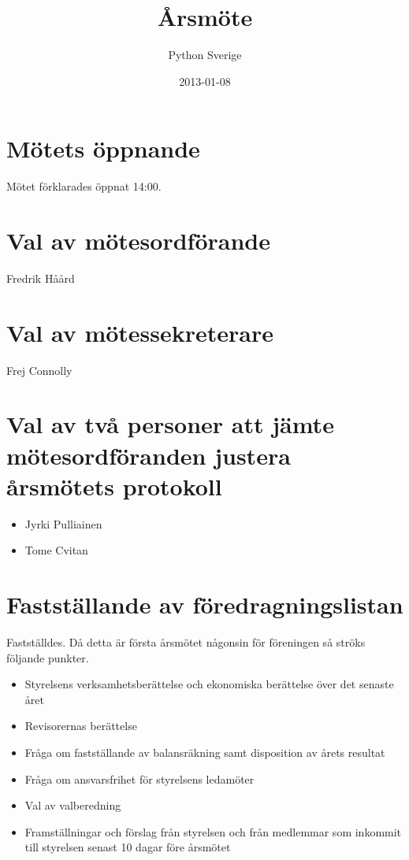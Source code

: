 \documentclass[11pt, a4paper]{article}
\title{Årsmöte}
\author{Python Sverige}
\date{2013-01-08}
\begin{document}
\maketitle

\section{Mötets öppnande}
Mötet förklarades öppnat 14:00.

\section{Val av mötesordförande}
Fredrik Håård

\section{Val av mötessekreterare}
Frej Connolly

\section{Val av två personer att jämte mötesordföranden justera årsmötets protokoll}
\begin{itemize}
    \item Jyrki Pulliainen
    \item Tome Cvitan
\end{itemize}

\section{Fastställande av föredragningslistan}
Fastställdes. Då detta är första årsmötet någonsin för föreningen så ströks
följande punkter.

\begin{itemize}
    \item Styrelsens verksamhetsberättelse och ekonomiska berättelse över det senaste året
    \item Revisorernas berättelse
    \item Fråga om fastställande av balansräkning samt disposition av årets resultat
    \item Fråga om ansvarsfrihet för styrelsens ledamöter
    \item Val av valberedning
    \item Framställningar och förslag från styrelsen och från medlemmar som inkommit till styrelsen senast 10 dagar före årsmötet
\end{itemize}
\end{document}
